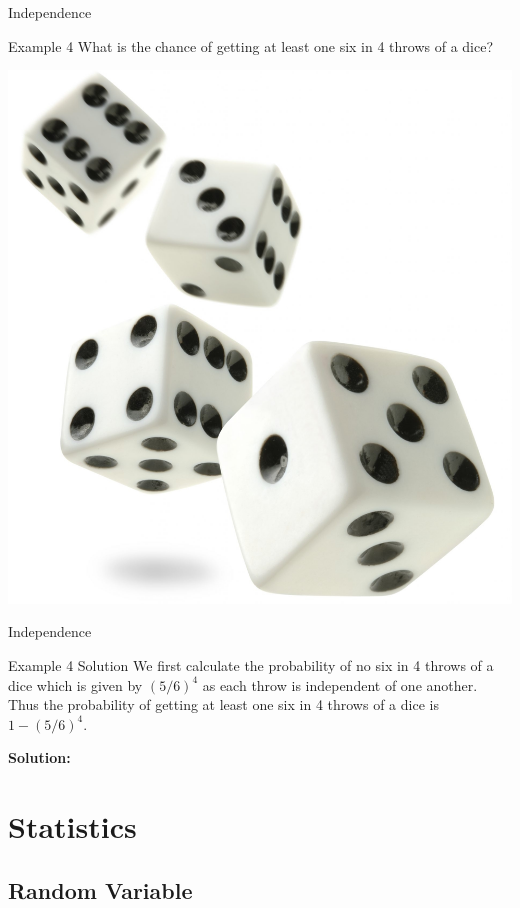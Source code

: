 \documentclass[aspectratio=169,xcolor=dvipsnames,svgnames,x11names,fleqn]{beamer}
\newcommand{\showanswers}{yes}
\begin{document}
    
    \begin{frame}[containsverbatim]{Independence}
    
        \begin{exampleblock}{Example 4}
        What is the chance of getting at least one six in 4 throws of a dice?
        \end{exampleblock}

        \begin{center}
            \includegraphics[width=0.15\linewidth]{figures/four_dice.jpg}
        \end{center}

    \end{frame}
    
    
    \begin{frame}[containsverbatim]{Independence}
        \ifthenelse{\equal{\showanswers}{yes}}
        {
    \begin{examplesolution}{Example 4 Solution}
        We first calculate the probability of no six in 4 throws of a dice which is given by $(5/6)^4$ as each throw is independent of one another. Thus the probability of getting at least one six in 4 throws of a dice is $1 - (5/6)^4$.
        \end{examplesolution}
        }
        {
            \textbf{Solution:} \color{LightGray}{Blank space for calculation}
        }
    \end{frame}

\section{Statistics}

\begin{frame}
    \sectionpage
\end{frame}



\subsection{Random Variable}
\end{document}
